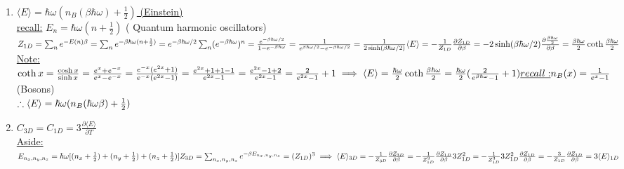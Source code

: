 \documentclass[12pt]{amsart}
\begin{document}
\begin{enumerate}
\item \underline{$\langle E \rangle = \hbar \omega ( n_{B} ( \beta \hbar \omega) + \frac{1}{2})$ (Einstein)}\\
\underline{recall:} $E_n = \hbar \omega(n+ \frac{1}{2})$ ( Quantum harmonic oscillators)\\
$Z_{1D} = \sum_n e^{-E(n)\beta} = \sum_n e^{- \beta \hbar \omega(n+ \frac{1}{2})} = e^{- \beta \hbar \omega/2} \sum_n ( e^{- \beta \hbar \omega})^n = \frac{e^{- \beta \hbar \omega/2}}{1 - e^{- \beta \hbar \omega}} = \frac{1}{e^{\beta \hbar \omega/2} - e^{- \beta \hbar \omega/2}} = \frac{1}{2 \sinh ( \beta \hbar \omega/2)}\\
\langle E \rangle = - \frac{1}{Z_{1D}} \frac{\partial Z_{1D}}{\partial \beta} = - 2 \sinh(\beta \hbar \omega/2) \frac{\partial \frac{\beta \hbar \omega}{2}}{\partial \beta} = \frac{\beta \hbar \omega}{2} \coth \frac{\beta \hbar \omega}{2}\\$
\underline{Note:} $\coth x = \frac{\cosh x}{\sinh x} = \frac{e^x + e^{-x}}{e^x - e^{-x}} = \frac{e^{-x}(e^{2x} + 1)}{e^{-x}(e^{2x} -1)}= \frac{e^{2x} +1 +1 -1}{e^{2x} -1} = \frac{e^{2x} -1 +2}{e^{2x}-1} = \frac{2}{e^{2x}-1} + 1\\
\implies \langle E \rangle = \frac{\hbar \omega}{2} \coth \frac{\beta \hbar \omega}{2} = \frac{\hbar \omega}{2}( \frac{2}{e^{\beta \hbar \omega} -1} + 1)\\
\underline{recall:} n_{B}(x) = \frac{1}{e^x-1}$ (Bosons)\\
$\therefore \langle E \rangle = \hbar \omega ( n_B (\hbar \omega \beta) + \frac{1}{2})\\$


\hdashrule[0.5ex][c]{\linewidth}{0.5pt}{1.5mm}

\item \underline{$C_{3D}=C_{1D} = 3 \frac{\partial \langle E \rangle}{\partial T}$}\\
\underline{Aside:} $E_{n_x,n_y,n_z} = \hbar \omega [ (n_x + \frac{1}{2}) + ( n_y + \frac{1}{2}) + ( n_z + \frac{1}{2})]\\
Z_{3D} = \sum_{n_x, n_y, n_z} e^{- \beta E_{n_x, n_y, n_z} }= ( Z_{1D})^3\\
\implies \langle E \rangle_{3D} = -\frac{1}{Z_{3D}} \frac{\partial Z_{3D}}{\partial \beta} = - \frac{1}{Z_{1D}^3} \frac{\partial Z_{1D}}{\partial \beta} 3 Z_{1D}^2\\
= - \frac{1}{Z_{1D}^3} 3 Z_{1D}^2 \frac{\partial Z_{1D}}{\partial \beta} = - \frac{3}{Z_{1D}} \frac{\partial Z_{1D}}{\partial \beta} = 3 \langle E \rangle_{1D}\\$




\end{enumerate}
\end{document}
